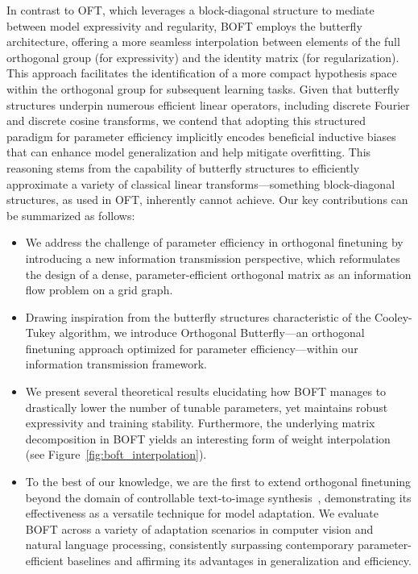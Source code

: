 In contrast to OFT, which leverages a block-diagonal structure to mediate between model expressivity and regularity, BOFT employs the butterfly architecture, offering a more seamless interpolation between elements of the full orthogonal group (for expressivity) and the identity matrix (for regularization). This approach facilitates the identification of a more compact hypothesis space within the orthogonal group for subsequent learning tasks. Given that butterfly structures underpin numerous efficient linear operators, including discrete Fourier and discrete cosine transforms, we contend that adopting this structured paradigm for parameter efficiency implicitly encodes beneficial inductive biases that can enhance model generalization and help mitigate overfitting. This reasoning stems from the capability of butterfly structures to efficiently approximate a variety of classical linear transforms—something block-diagonal structures, as used in OFT, inherently cannot achieve. Our key contributions can be summarized as follows:

\begin{itemize}[leftmargin=*,nosep]
    \item We address the challenge of parameter efficiency in orthogonal finetuning by introducing a new information transmission perspective, which reformulates the design of a dense, parameter-efficient orthogonal matrix as an information flow problem on a grid graph.
    \item Drawing inspiration from the butterfly structures characteristic of the Cooley-Tukey algorithm, we introduce Orthogonal Butterfly—an orthogonal finetuning approach optimized for parameter efficiency—within our information transmission framework.
    \item We present several theoretical results elucidating how BOFT manages to drastically lower the number of tunable parameters, yet maintains robust expressivity and training stability. Furthermore, the underlying matrix decomposition in BOFT yields an interesting form of weight interpolation (see Figure~\ref{fig:boft_interpolation}).
    \item To the best of our knowledge, we are the first to extend orthogonal finetuning beyond the domain of controllable text-to-image synthesis~\cite{qiu2023controlling}, demonstrating its effectiveness as a versatile technique for model adaptation. We evaluate BOFT across a variety of adaptation scenarios in computer vision and natural language processing, consistently surpassing contemporary parameter-efficient baselines and affirming its advantages in generalization and efficiency.
\end{itemize}

